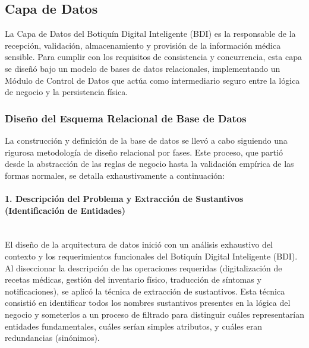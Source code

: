 \subsection{Capa de Datos}

La Capa de Datos del Botiquín Digital Inteligente (BDI) es la responsable de la recepción, validación, almacenamiento y provisión de la información médica sensible. Para cumplir con los requisitos de consistencia y concurrencia, esta capa se diseñó bajo un modelo de bases de datos relacionales, implementando un Módulo de Control de Datos que actúa como intermediario seguro entre la lógica de negocio y la persistencia física.

\subsubsection{Diseño del Esquema Relacional de Base de Datos}


La construcción y definición de la base de datos se llevó a cabo siguiendo una rigurosa metodología de diseño relacional por fases. Este proceso, que partió desde la abstracción de las reglas de negocio hasta la validación empírica de las formas normales, se detalla exhaustivamente a continuación:

\paragraph{1. Descripción del Problema y Extracción de Sustantivos (Identificación de Entidades)} \leavevmode \\

El diseño de la arquitectura de datos inició con un análisis exhaustivo del contexto y los requerimientos funcionales del Botiquín Digital Inteligente (BDI). Al diseccionar la descripción de las operaciones requeridas (digitalización de recetas médicas, gestión del inventario físico, traducción de síntomas y notificaciones), se aplicó la técnica de extracción de sustantivos. Esta técnica consistió en identificar todos los nombres sustantivos presentes en la lógica del negocio y someterlos a un proceso de filtrado para distinguir cuáles representarían entidades fundamentales, cuáles serían simples atributos, y cuáles eran redundancias (sinónimos). 

